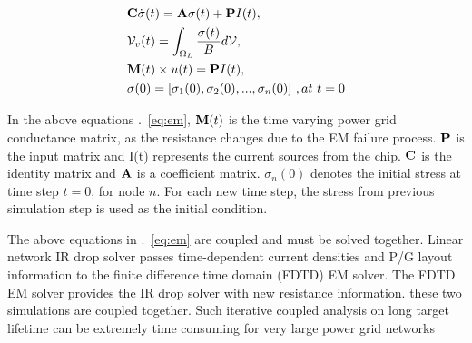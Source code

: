 \begin{align}
	\label{eq:em}
	\begin{split}
		&{\bf C} \dot{\sigma}(t)  = {\bf A} \sigma(t) + {\bf P}I(t),  \\
		&\mathcal{V}_v(t)  = \int_{\Omega_L}\frac{\sigma(t)}{B}d\mathcal{V},  \\ 
		&{\bf M}(t) \times u(t)  = {\bf P} I(t), \\
		&{\bf \sigma}(0)  = [\sigma_1(0), \sigma_2(0), ..., \sigma_n(0)] \,\, ,at \,\, t = 0 
	\end{split}
\end{align}



In the above equations .~\eqref{eq:em}, ${\bf M}(t)$ is the time varying power grid conductance matrix, as the resistance changes due to the EM failure process. ${{\bf P}}$ is the input matrix and I(t) represents the current sources from the chip. ${{\bf C}}$ is the identity matrix and ${{\bf A}}$ is a coefficient matrix. $\sigma_{n}(0)$ denotes the initial stress at time step $t = 0$, for node $n$. For each new time step, the stress from previous simulation step is used as the initial condition.

The above equations in .~\eqref{eq:em} are coupled and must be solved together. Linear network IR drop solver passes time-dependent current densities and P/G layout information to the finite difference time domain (FDTD) EM solver. The FDTD EM solver provides the IR drop solver with new resistance information.  these two simulations are coupled together. Such iterative coupled analysis on long target lifetime can be extremely time consuming for very large power grid networks ~\cite{SunYu:TDMR'20,EMspiceSourceCode} 



